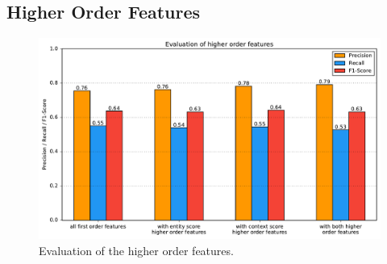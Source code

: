 \subsection{Higher Order Features}
\begin{figure}[H]
	\centering
	\includegraphics[width=\textwidth]{img/higher_order_eval}
	\caption{Evaluation of the higher order features.}
	\label{ho_eval_gen}
\end{figure}
